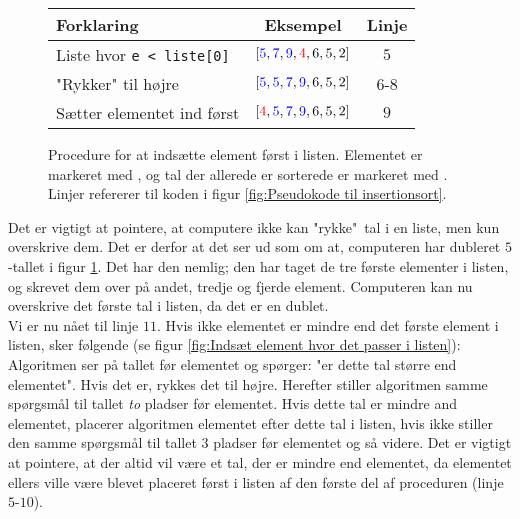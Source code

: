 
	\begin{figure}[h]
		\begin{center}
			\padtable
			\begin{tabular}{l|c|c}
				Forklaring & Eksempel & Linje \\
				\hline
				Liste hvor \verb|e < liste[0]| & $[\color{blue}5\color{black},\color{blue}7\color{black},\color{blue}9\color{black},\color{red}4\color{black},6,5,2]$ & $5$ \\
				"Rykker" til højre & $[\color{blue}5\color{black},\color{blue}5\color{black},\color{blue}7\color{black},\color{blue}9\color{black},6,5,2]$ & $6$-$8$\\
				Sætter elementet ind først  & $[\color{red}4\color{black},\color{blue}5\color{black},\color{blue}7\color{black},\color{blue}9\color{black},6,5,2]$ & $9$
			\end{tabular}
		\end{center}
		\vspace{-3mm}
		\caption{Procedure for at indsætte element først i listen. Elementet er markeret med , og tal der allerede er sorterede er markeret med . Linjer refererer til koden i figur \ref{fig:Pseudokode til insertionsort}.}
		\label{fig:Indsæt element først i listen}
	\end{figure}

	Det er vigtigt at pointere, at computere ikke kan "rykke"\ tal i en liste, men kun overskrive dem. Det er derfor at det ser ud som om at, computeren har dubleret $5$-tallet i figur \ref{fig:Indsæt element først i listen}. Det har den nemlig; den har taget de tre første elementer i listen, og skrevet dem over på andet, tredje og fjerde element. Computeren kan nu overskrive det første tal i listen, da det er en dublet.\\

	Vi er nu nået til linje $11$. Hvis ikke elementet er mindre end det første element i listen, sker følgende (se figur \ref{fig:Indsæt element hvor det passer i listen}): Algoritmen ser på tallet før elementet og spørger: "er dette tal større end elementet". Hvis det er, rykkes det til højre. Herefter stiller algoritmen samme spørgsmål til tallet \emph{to} pladser før elementet. Hvis dette tal er mindre and elementet, placerer algoritmen elementet efter dette tal i listen, hvis ikke stiller den samme spørgsmål til tallet 3 pladser før elementet og så videre. Det er vigtigt at pointere, at der altid vil være et tal, der er mindre end elementet, da elementet ellers ville være blevet placeret først i listen af den første del af proceduren (linje $5$-$10$).


